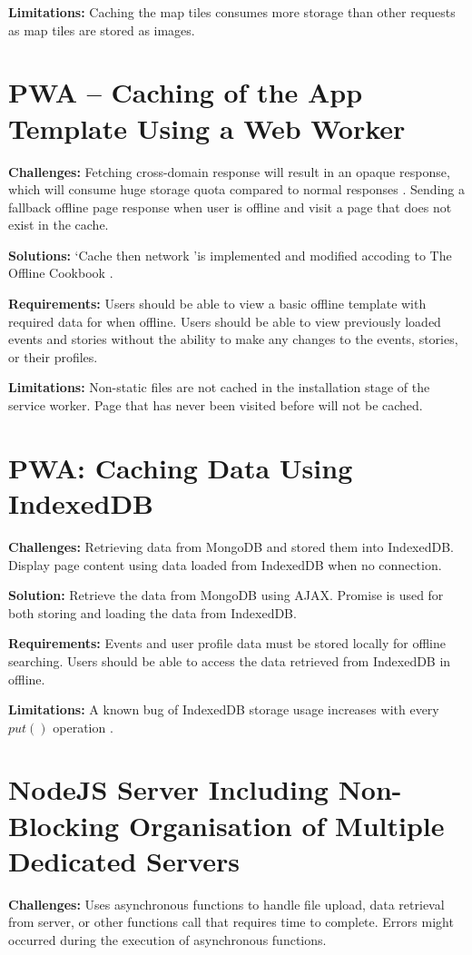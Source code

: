 \documentclass[11pt, a4paper]{article}
\begin{document}
\textbf{Limitations:} Caching the map tiles consumes more storage than other requests as map tiles
are stored as images. 

\section{PWA – Caching of the App Template Using a Web Worker}
\textbf{Challenges:} Fetching cross-domain response will result in an opaque response, which will
consume huge storage quota compared to normal responses \cite{opaque_workbox}. Sending a fallback
offline page response when user is offline and visit a page that does not exist in the cache.

\textbf{Solutions:} `Cache then network 'is implemented and modified accoding to The Offline
Cookbook \cite{offline_cookbook}.

\textbf{Requirements:} Users should be able to view a basic offline template with required data for
when offline. Users should be able to view previously loaded events and stories without the ability
to make any changes to the events, stories, or their profiles.

\textbf{Limitations:} Non-static files are not cached in the installation stage of the service
worker. Page that has never been visited before will not be cached. 

\section{PWA: Caching Data Using IndexedDB}
\textbf{Challenges:} Retrieving data from MongoDB and stored them into IndexedDB. Display page
content using data loaded from IndexedDB when no connection.

\textbf{Solution:} Retrieve the data from MongoDB using AJAX. Promise is used for both storing and
loading the data from IndexedDB.

\textbf{Requirements:} Events and user profile data must be stored locally for offline searching.
Users should be able to access the data retrieved from IndexedDB in offline.

\textbf{Limitations:} A known bug of IndexedDB storage usage increases with every $put()$ operation
\cite{leveldb_593, leveldb_603}. 

\section{NodeJS Server Including Non-Blocking Organisation of Multiple Dedicated Servers}
\textbf{Challenges:} Uses asynchronous functions to handle file upload, data retrieval from server,
or other functions call that requires time to complete. Errors might occurred during the execution
of asynchronous functions.
\end{document}
